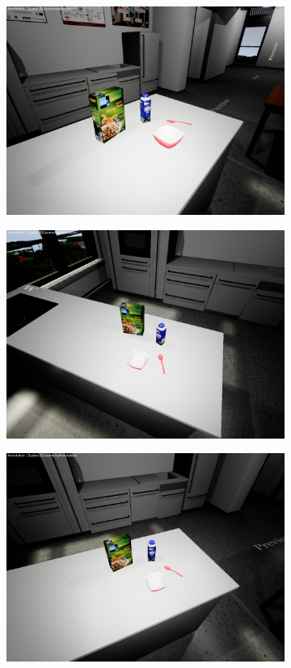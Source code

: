 \begin{figure}
\begin{subfigure}[b]{0.3\textwidth}
		\includegraphics[scale=.1]{img/chapter3/sceneEx_3}	
	\end{subfigure}
	\quad
	\begin{subfigure}[b]{0.3\textwidth}
		\includegraphics[scale=.1]{img/chapter3/sceneEx_4}	
	\end{subfigure}
	\quad
	\begin{subfigure}[b]{0.3\textwidth}
		\includegraphics[scale=.1]{img/chapter3/sceneEx_5}	

\end{subfigure}
\end{figure}
